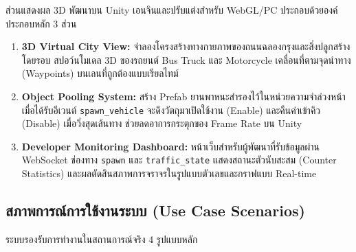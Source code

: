 \documentclass[12pt,a4paper]{report}
\begin{document}
ส่วนแสดงผล 3D พัฒนาบน Unity เอนจินและปรับแต่งสำหรับ WebGL/PC
ประกอบด้วยองค์ประกอบหลัก 3 ส่วน

\begin{enumerate}
  \item \textbf{3D Virtual City View:}
        จำลองโครงสร้างทางกายภาพของถนนฉลองกรุงและสิ่งปลูกสร้างโดยรอบ
        สปอว์นโมเดล 3D ของรถยนต์ Bus Truck และ Motorcycle
        เคลื่อนที่ตามจุดนำทาง (Waypoints) บนเลนที่ถูกต้องแบบเรียลไทม์

  \item \textbf{Object Pooling System:}
        สร้าง Prefab ยานพาหนะสำรองไว้ในหน่วยความจำล่วงหน้า
        เมื่อได้รับอีเวนต์ \texttt{spawn\_vehicle}
        จะดึงวัตถุมาเปิดใช้งาน (Enable)
        และคืนค่าเข้าคิว (Disable) เมื่อวิ่งสุดเส้นทาง
        ช่วยลดอาการกระตุกของ Frame Rate บน Unity

  \item \textbf{Developer Monitoring Dashboard:}
        หน้าเว็บสำหรับผู้พัฒนาที่รับข้อมูลผ่าน WebSocket ช่องทาง
        \texttt{spawn} และ \texttt{traffic\_state}
        แสดงสถานะตัวนับสะสม (Counter Statistics)
        และผลตัดสินสภาพการจราจรในรูปแบบตัวเลขและกราฟแบบ Real-time
\end{enumerate}

\subsection{สภาพการณ์การใช้งานระบบ (Use Case Scenarios)}
\label{subsec:scenarios}

ระบบรองรับการทำงานในสถานการณ์จริง 4 รูปแบบหลัก
\end{document}
